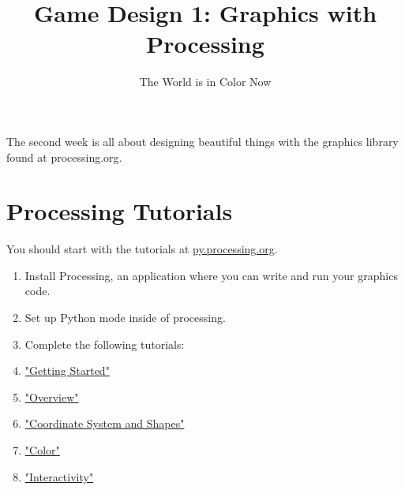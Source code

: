 \documentclass{42-en}
\begin{document}
\title{Game Design 1: Graphics with Processing}
\subtitle{The World is in Color Now}


\summary
{
	The second week is all about designing beautiful things with the graphics library found at processing.org.
}

\maketitle

\tableofcontents


\chapter{Processing Tutorials}

You should start with the tutorials at \href{http://py.processing.org/tutorials/}{py.processing.org}.\\

\begin{enumerate}

	\item Install Processing, an application where you can write and run your graphics code.
	\item Set up Python mode inside of processing.
	\item Complete the following tutorials:
	\item \href{http://py.processing.org/tutorials/gettingstarted/}{"Getting Started"}
	\item \href{http://py.processing.org/tutorials/overview/}{"Overview"}
	\item \href{http://py.processing.org/tutorials/drawing/}{"Coordinate System and Shapes"}
	\item \href{http://py.processing.org/tutorials/color/}{"Color"}
	\item \href{http://py.processing.org/tutorials/interactivity/}{"Interactivity"}

\end{enumerate}
\end{document}
